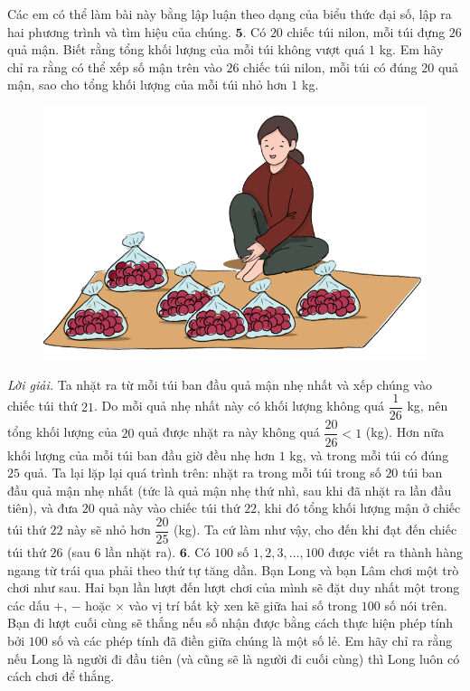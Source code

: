 \begin{multicols}{2}
	\vskip 0.1cm
	Các em có thể làm bài này bằng lập luận theo dạng của biểu thức đại số, lập ra hai phương trình và tìm hiệu của chúng.
	\vskip 0.1cm
	$\pmb{5.}$ Có $20$ chiếc túi nilon, mỗi túi đựng $26$ quả mận. Biết rằng tổng khối lượng của mỗi túi không vượt quá $1$ kg. Em hãy chỉ ra rằng có thể xếp số mận trên vào $26$ chiếc túi nilon, mỗi túi có đúng $20$ quả mận, sao cho tổng khối lượng của mỗi túi nhỏ hơn $1$ kg.
	\begin{figure}[H]
		\centering
		\vspace*{-5pt}
		\captionsetup{labelformat= empty, justification=centering}
		\includegraphics[width=0.8\linewidth]{Pi9_bai5}
		\vspace*{-5pt}
	\end{figure}
	\textit{Lời giải.} 	Ta nhặt ra từ mỗi túi ban đầu quả mận nhẹ nhất và xếp chúng vào chiếc túi thứ $21$. Do mỗi quả nhẹ nhất này có khối lượng không quá $\dfrac{1}{26}$ kg, nên tổng khối lượng của $20$ quả được nhặt ra này không quá $\dfrac{20}{26} <1$ (kg). Hơn nữa khối lượng của mỗi túi ban đầu giờ đều nhẹ hơn $1$ kg, và trong mỗi túi có đúng $25$ quả. Ta lại lặp lại quá trình trên: nhặt ra trong mỗi túi trong số $20$ túi ban đầu quả mận nhẹ nhất (tức là quả mận nhẹ thứ nhì, sau khi đã nhặt ra lần đầu tiên), và đưa $20$ quả này vào chiếc túi thứ $22$, khi đó tổng khối lượng mận ở chiếc túi thứ $22$ này sẽ nhỏ hơn $\dfrac{20}{25}$ (kg). Ta cứ làm như vậy, cho đến khi đạt đến chiếc túi thứ $26$ (sau $6$ lần nhặt ra).
	\vskip 0.1cm
	$\pmb{6.}$ 	Có $100$ số $1, 2, 3, \ldots, 100$ được viết ra thành hàng ngang từ trái qua phải theo thứ tự tăng dần. Bạn Long và bạn Lâm chơi một trò chơi như sau. Hai bạn lần lượt đến lượt chơi của mình sẽ đặt duy nhất một trong các dấu $+$, $-$ hoặc $\times$ vào vị trí bất kỳ xen kẽ giữa hai số trong $100$ số nói trên. Bạn đi lượt cuối cùng sẽ thắng nếu số nhận được bằng cách thực hiện phép tính bởi $100$ số và các phép tính đã điền giữa chúng là một số lẻ. Em hãy chỉ ra rằng nếu Long là người đi đầu tiên (và cũng sẽ là người đi cuối cùng) thì Long luôn có cách chơi để thắng.

\end{multicols}
